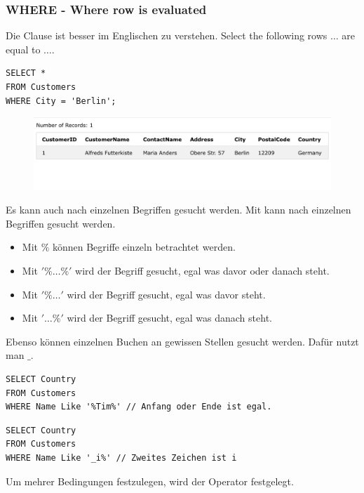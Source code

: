 \subsubsection{WHERE - Where row is evaluated}
Die Clause  ist besser im Englischen zu verstehen. 
Select the following rows  $\dots$ are equal to $\dots$.

\begin{lstlisting}[style=SQL]
SELECT *
FROM Customers
WHERE City = 'Berlin';
\end{lstlisting}

\begin{figure}[H]
	\centering
	\includegraphics[scale = 0.3]{attachment/chapter_3/Scc044}
	\caption{}
	\label{fig:Scc044}
\end{figure}

Es kann auch nach einzelnen Begriffen gesucht werden. Mit  kann nach einzelnen Begriffen gesucht werden. 
\begin{itemize} 
\item Mit $\%$ können Begriffe einzeln betrachtet werden.
\item Mit $'\%\dots\%'$ wird der Begriff gesucht, egal was davor oder danach steht.
\item Mit $'\%\dots'$ wird der Begriff gesucht, egal was davor steht.
\item Mit $'\dots\%'$ wird der Begriff gesucht, egal was danach steht.
\end{itemize}

Ebenso können einzelnen Buchen an gewissen Stellen gesucht werden. Dafür nutzt man $\_$.

\begin{lstlisting}[style=SQL]
SELECT Country
FROM Customers
WHERE Name Like '%Tim%' // Anfang oder Ende ist egal.
\end{lstlisting}

\begin{lstlisting}[style=SQL]
SELECT Country
FROM Customers
WHERE Name Like '_i%' // Zweites Zeichen ist i
\end{lstlisting}

Um mehrer Bedingungen festzulegen, wird der  Operator festgelegt. 

